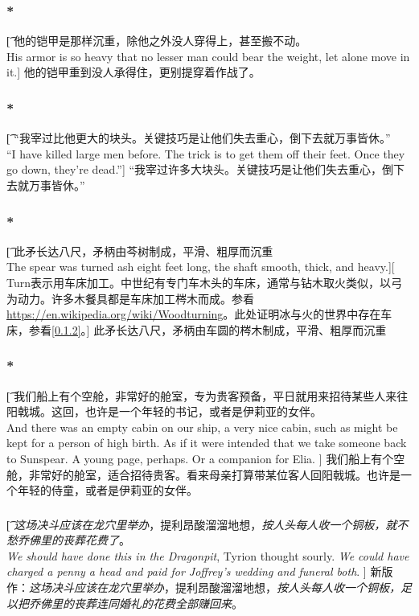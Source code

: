 \documentclass[12pt,a4paper]{article}
\begin{document}
\subsubsection{\color{red}*}\t[
	他的铠甲是那样沉重，除他之外没人穿得上，甚至搬不动。\\
	His armor is so heavy that no lesser man could bear the weight, let alone move in it.]
	他的铠甲重到没人承得住，更别提穿着作战了。
	
\subsubsection{\color{red}*}\t[
	“我宰过比他更大的块头。关键技巧是让他们失去重心，倒下去就万事皆休。”\\
	“I have killed large men before. The trick is to get them off their feet. Once they go down, they're dead.”]
	“我宰过许多大块头。关键技巧是让他们失去重心，倒下去就万事皆休。”
	
\subsubsection{\color{red}*}\label{3.70.1}\t[	
	此矛长达八尺，矛柄由芩树制成，平滑、粗厚而沉重\\
	The spear was turned ash eight feet long, the shaft smooth, thick, and heavy.][
	Turn表示用车床加工。中世纪有专门车木头的车床，通常与钻木取火类似，以弓为动力。许多木餐具都是车床加工梣木而成。参看\url{https://en.wikipedia.org/wiki/Woodturning}。此处证明冰与火的世界中存在车床，参看\ref{0.1.2}。]
	此矛长达八尺，矛柄由车圆的梣木制成，平滑、粗厚而沉重
	
\subsubsection{\color{red}*}\t[
	我们船上有个空舱，非常好的舱室，专为贵客预备，平日就用来招待某些人来往阳戟城。这回，也许是一个年轻的书记，或者是伊莉亚的女伴。\\
	And there was an empty cabin on our ship, a very nice cabin, such as might be kept for a person of high birth. As if it were intended that we take someone back to Sunspear. A young page, perhaps. Or a companion for Elia. ]
	我们船上有个空舱，非常好的舱室，适合招待贵客。看来母亲打算带某位客人回阳戟城。也许是一个年轻的侍童，或者是伊莉亚的女伴。
	
\subsubsection{}\t[
	\emph{这场决斗应该在龙穴里举办}，提利昂酸溜溜地想，\emph{按人头每人收一个铜板，就不愁乔佛里的丧葬花费了}。\\
\emph{	We should have done this in the Dragonpit}, Tyrion thought sourly. \emph{We could have charged a penny a head and paid for Joffrey's wedding and funeral both}. ]
	新版作：\emph{这场决斗应该在龙穴里举办}，提利昂酸溜溜地想，\emph{按人头每人收一个铜板，足以把乔佛里的丧葬连同婚礼的花费全部赚回来}。
\end{document}
